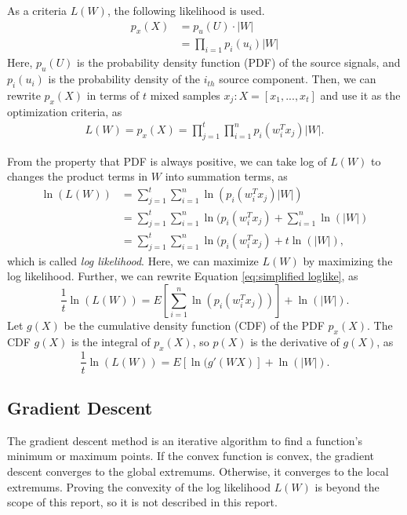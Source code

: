 \documentclass[conference]{IEEEtran}
\begin{document}
As a criteria  $L(W)$, the following likelihood is used.
\begin{equation}
\begin{aligned}
     p_x(X) &= p_u(U)\cdot|W| \\
    & = \prod_{i=1}p_i(u_i)|W|    
\end{aligned}
\end{equation}
Here, $p_u(U)$ is the probability density function (PDF) of the source signals, and $p_i(u_i)$ is the probability density of the $i_{th}$ source component.
Then, we can rewrite $p_x(X)$ in terms of $t$ mixed samples $x_j: X= \left[x_1, ... , x_t \right]$ and use it as the optimization criteria, as
\begin{equation}
\begin{aligned}
    L(W) = p_x(X) =  \prod_{j=1}^t\prod_{i=1}^np_i(w_i^Tx_j)|W|.
    \label{eq:likelihood def}
\end{aligned}
\end{equation}

From the property that PDF is always positive, we can take log of $L(W)$ to changes the product terms in $W$ into summation terms, as
\begin{equation}
\begin{aligned}
    \ln{(L(W))} 
     &= \sum_{j=1}^t\sum_{i=1}^n\ln{(p_i(w_i^Tx_j)|W|)}\\
     &= \sum_{j=1}^t\sum_{i=1}^n\ln{(p_i(w_i^Tx_j)} + \sum_{i=1}^n\ln(|W|)\\
     &= \sum_{j=1}^t\sum_{i=1}^n\ln{(p_i(w_i^Tx_j)} + t\ln{(|W|)},
     \label{eq:simplified loglike}
\end{aligned}
\end{equation}
which is called {\it log likelihood}. Here, we can maximize $L(W)$ by maximizing the log likelihood. Further, we can rewrite Equation \ref{eq:simplified loglike}, as
\begin{equation}
    \frac{1}{t}\ln{(L(W))} = E\left[\sum_{i=1}^n\ln{(p_i(w_i^Tx_j))}\right] + \ln{(|W|)}.
    \label{eq:log-like-Exp}
\end{equation}
Let $g(X)$ be the cumulative density function (CDF) of the PDF $p_x(X)$.
The CDF $g(X)$ is the integral of $p_x(X)$, so $p(X)$ is the derivative of $g(X)$, as
\begin{equation}
    \frac{1}{t}\ln{(L(W))} = E\left[\ln{(g'(WX)}\right] + \ln{(|W|)}.
    \label{eq:log-like-Exp-cdf} 
\end{equation}


\subsection{Gradient Descent}
The gradient descent method is an iterative algorithm to find a function's minimum or maximum points. If the convex function is convex, the gradient descent converges to the global extremums. Otherwise, it converges to the local extremums. Proving the convexity of the log likelihood $L(W)$ is beyond the scope of this report, so it is not described in this report.
\end{document}
